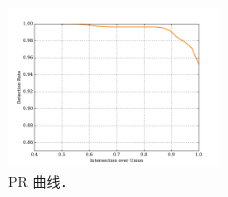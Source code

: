\renewcommand{\captiontitle}{PR 曲线}
\begin{figure}
\begin{center}
\includegraphics[width=0.5\textwidth]{./data/det_ROC_hgd_3.pdf}
\caption[\captiontitle]{\captiontitle{}．
}
\label{fig:roc}
\end{center}
\end{figure}

